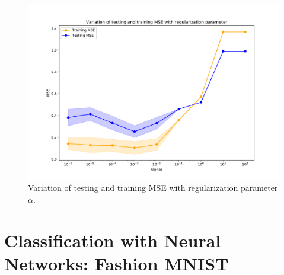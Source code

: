 \documentclass{article}
\begin{document}
\begin{figure}[!ht]
\centering
\includegraphics[width=\textwidth]{./Figures/1_2_mse.pdf}
\caption{Variation of testing and training MSE with regularization parameter $\alpha$.}
\label{1_2_mse}
\end{figure}

\clearpage
\section{Classification with Neural Networks: Fashion MNIST}
\end{document}
